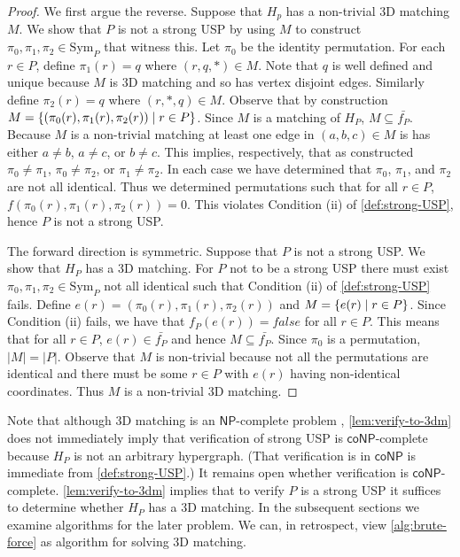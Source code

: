 \documentclass[11pt]{article}
\newcommand\sse{\subseteq}
\newcommand\Sym[1]{\ensuremath{\mathrm{Sym}_{#1}}}
\newcommand\condset[2]{\set{#1 \;|\; #2}}
\renewcommand\NP{\ensuremath{\mathsf{NP}}}
\newcommand\coNP{\ensuremath{\mathsf{coNP}}}
\begin{document}
\begin{proof}
  We first argue the reverse.  Suppose that $H_p$ has a
  non-trivial 3D matching $M$.  We show that $P$ is not a strong USP by
  using $M$ to construct $\pi_0, \pi_1, \pi_2 \in \Sym{P}$ that
  witness this.  Let $\pi_0$ be the identity permutation.  For each $r
  \in P$, define $\pi_1(r) = q$ where $(r,q,*) \in M$.  Note that $q$
  is well defined and unique because $M$ is 3D matching and so has
  vertex disjoint edges.  Similarly define $\pi_2(r) = q$ where
  $(r,*,q) \in M$.  Observe that by construction $M =
  \condset{(\pi_0(r),\pi_1(r),\pi_2(r))}{r \in P}$.  Since $M$ is a
  matching of $H_P$, $M \sse \bar{f_P}$.  Because $M$ is a non-trivial
  matching at least one edge in $(a,b,c) \in M$ is has either $a \neq
  b$, $a \neq c$, or $b \neq c$.  This implies, respectively, that as
  constructed $\pi_0 \neq \pi_1$, $\pi_0 \neq \pi_2$, or $\pi_1 \neq
  \pi_2$.  In each case we have determined that $\pi_0$, $\pi_1$, and
  $\pi_2$ are not all identical.  Thus we determined permutations such
  that for all $r \in P$, $f(\pi_0(r), \pi_1(r), \pi_2(r)) = 0$.  This
  violates Condition (ii) of \autoref{def:strong-USP}, hence $P$ is not a
  strong USP.

  The forward direction is symmetric.  Suppose
  that $P$ is not a strong USP. We show that $H_P$ has a 3D matching.
  For $P$ not to be a strong USP there must exist $\pi_0, \pi_1, \pi_2
  \in \Sym{P}$ not all identical such that Condition (ii) of
  \autoref{def:strong-USP} fails.  Define $e(r) =
  (\pi_0(r),\pi_1(r),\pi_2(r))$ and $M = \condset{e(r)}{r \in P}$.
  Since Condition (ii) fails, we have that $f_P(e(r)) = false$ for all $r
  \in P$.  This means that for all $r \in P$, $e(r) \in \bar{f_P}$ and
  hence $M \sse \bar{f_P}$.  Since $\pi_0$ is a permutation, $|M| =
  |P|$.  Observe that $M$ is non-trivial because not all 
  the permutations are identical and there must be some $r \in P$ with
  $e(r)$ having non-identical coordinates.  Thus $M$ is a non-trivial
  3D matching.
\end{proof}

Note that although 3D matching is an \NP-complete problem \cite{gj79},
\autoref{lem:verify-to-3dm} does not immediately imply that
verification of strong USP is \coNP-complete because $H_P$ is not an
arbitrary hypergraph.  (That verification is in \coNP{} is immediate
from \autoref{def:strong-USP}.)
It remains open whether verification is
\coNP-complete.
\autoref{lem:verify-to-3dm} implies that to verify $P$ is a strong USP
it suffices to determine whether $H_P$ has a 3D matching.  In the
subsequent sections we examine algorithms for the later problem.  We
can, in retrospect, view \autoref{alg:brute-force} as algorithm for solving 3D
matching.
\end{document}
